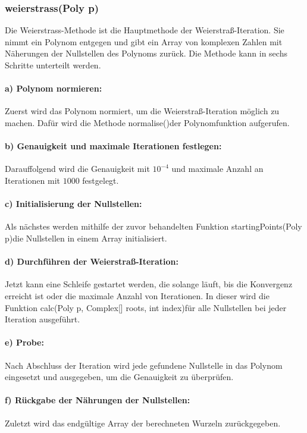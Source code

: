 \documentclass[12pt]{article}
\begin{document}
\subsubsection*{weierstrass(Poly p)}
Die \glqq Weierstrass\grqq-Methode ist die Hauptmethode der Weierstraß-Iteration. Sie nimmt ein Polynom entgegen und gibt ein Array von komplexen Zahlen mit Näherungen der Nullstellen des Polynoms zurück. Die Methode kann in sechs Schritte unterteilt werden.

\paragraph{a) Polynom normieren:}
Zuerst wird das Polynom normiert, um die Weierstraß-Iteration möglich zu machen. Dafür wird die Methode \glqq normalise()\grqq\space der Polynomfunktion aufgerufen.

\paragraph{b) Genauigkeit und maximale Iterationen festlegen:}
Darauffolgend wird die Genauigkeit mit $10^{-4}$ und maximale Anzahl an Iterationen mit $1000$ festgelegt.

\paragraph{c) Initialisierung der Nullstellen:}
Als nächstes werden mithilfe der zuvor behandelten Funktion \glqq startingPoints(Poly p)\grqq\space die Nullstellen in einem Array initialisiert.

\paragraph{d) Durchführen der Weierstraß-Iteration:}
Jetzt kann eine Schleife gestartet werden, die solange läuft, bis die Konvergenz erreicht ist oder die maximale Anzahl von Iterationen. In dieser wird die Funktion \glqq calc(Poly p, Complex[] roots, int index)\grqq\space für alle Nullstellen bei jeder Iteration ausgeführt.

\paragraph{e) Probe:}
Nach Abschluss der Iteration wird jede gefundene Nullstelle in das Polynom eingesetzt und ausgegeben, um die Genauigkeit zu überprüfen.

\paragraph{f) Rückgabe der Nährungen der Nullstellen:}
Zuletzt wird das endgültige Array der berechneten Wurzeln zurückgegeben.
\end{document}
